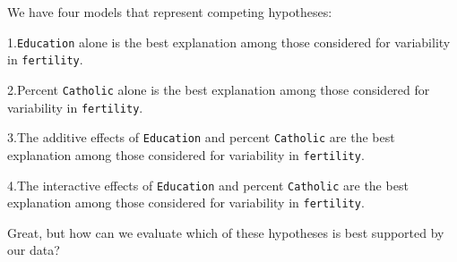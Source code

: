 \documentclass[
]{book}
\newenvironment{Shaded}{\begin{snugshade}}{\end{snugshade}}
\newcommand{\CommentTok}[1]{\textcolor[rgb]{0.56,0.35,0.01}{\textit{#1}}}
\newcommand{\DataTypeTok}[1]{\textcolor[rgb]{0.13,0.29,0.53}{#1}}
\newcommand{\KeywordTok}[1]{\textcolor[rgb]{0.13,0.29,0.53}{\textbf{#1}}}
\newcommand{\NormalTok}[1]{#1}
\newcommand{\OperatorTok}[1]{\textcolor[rgb]{0.81,0.36,0.00}{\textbf{#1}}}
\newcommand{\StringTok}[1]{\textcolor[rgb]{0.31,0.60,0.02}{#1}}
\begin{document}
\begin{Shaded}
\end{Shaded}

We have four models that represent competing hypotheses:

1.\texttt{Education} alone is the best explanation among those considered for variability in \texttt{fertility}.

2.Percent \texttt{Catholic} alone is the best explanation among those considered for variability in \texttt{fertility}.

3.The additive effects of \texttt{Education} and percent \texttt{Catholic} are the best explanation among those considered for variability in \texttt{fertility}.

4.The interactive effects of \texttt{Education} and percent \texttt{Catholic} are the best explanation among those considered for variability in \texttt{fertility}.

Great, but how can we evaluate which of these hypotheses is best supported by our data?
\end{document}
